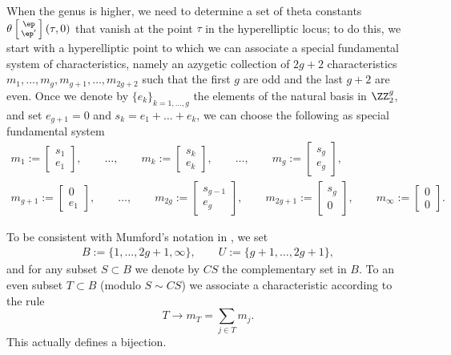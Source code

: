 When the genus is higher, we need to determine a set of theta constants $\theta \left[\begin{smallmatrix} \ep \\ \ep ' \end{smallmatrix}\right] (\tau,0)$ that vanish at the point $\tau$ in the hyperelliptic locus; to do this, we start with a hyperelliptic point to which we can associate a special fundamental system of characteristics, namely an azygetic collection of $2g+2$ characteristics $m_1, \dots, m_g, m_{g+1}, \dots, m_{2g+2}$ such that the first $g$ are odd and the last $g+2$ are even. Once we denote by $\{e_k\}_{k=1, \dots, g}$ the elements of the natural basis in ${\ZZ^g_2}$, and set $e_{g+1}= 0$ and $s_k= e_1+\dots+e_k$, we can choose the following as special fundamental system
\begin{gather}
 m_1:=\begin{bmatrix} s_1 \\ e_1\end{bmatrix},\qquad \dots, \qquad m_k:=\begin{bmatrix} s_k \\ e_k\end{bmatrix},\qquad\dots,\qquad m_g:=\begin{bmatrix} s_g \\ e_g\end{bmatrix},
\nonumber\\
m_{g+1}:=\begin{bmatrix} 0 \\ e_{1}\end{bmatrix},\qquad \dots,\qquad m_{2g}:=\begin{bmatrix} s_{g-1} \\ e_{g}\end{bmatrix}, \qquad m_{2g+1}:=\begin{bmatrix} s_g \\ 0
\end{bmatrix},\qquad m_{\infty}:=\begin{bmatrix} 0 \\ 0 \end{bmatrix} .\label{eq:FS}
\end{gather}

To be consistent with Mumford's notation in \cite[p.~106]{mu}, we set
\begin{gather}\label{BU}
B:=\{1, \dots, 2g+ 1, \infty \} ,\qquad U:= \{ g+1, \dots , 2g+1 \},
\end{gather}
and for any subset $S\subset B$ we denote by $ CS$ the complementary set in $B$.
 To an even subset $T\subset B$ (modulo $S \sim CS$) we associate a characteristic according to the rule
 \[
T\to m_T= \sum_{j\in T} m_j .
\]
This actually defines a bijection.

